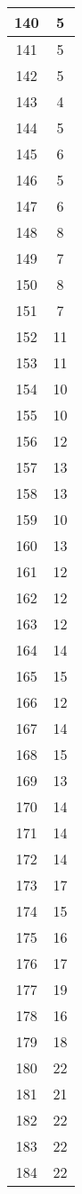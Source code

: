 \documentclass[letterpaper, 12pt]{article}
\begin{document}
\begin{longtable}{|c|c|}
\hline
140 & 5 \\
\hline
141 & 5 \\
\hline
142 & 5 \\
\hline
143 & 4 \\
\hline
144 & 5 \\
\hline
145 & 6 \\
\hline
146 & 5 \\
\hline
147 & 6 \\
\hline
148 & 8 \\
\hline
149 & 7 \\
\hline
150 & 8 \\
\hline
151 & 7 \\
\hline
152 & 11 \\
\hline
153 & 11 \\
\hline
154 & 10 \\
\hline
155 & 10 \\
\hline
156 & 12 \\
\hline
157 & 13 \\
\hline
158 & 13 \\
\hline
159 & 10 \\
\hline
160 & 13 \\
\hline
161 & 12 \\
\hline
162 & 12 \\
\hline
163 & 12 \\
\hline
164 & 14 \\
\hline
165 & 15 \\
\hline
166 & 12 \\
\hline
167 & 14 \\
\hline
168 & 15 \\
\hline
169 & 13 \\
\hline
170 & 14 \\
\hline
171 & 14 \\
\hline
172 & 14 \\
\hline
173 & 17 \\
\hline
174 & 15 \\
\hline
175 & 16 \\
\hline
176 & 17 \\
\hline
177 & 19 \\
\hline
178 & 16 \\
\hline
179 & 18 \\
\hline
180 & 22 \\
\hline
181 & 21 \\
\hline
182 & 22 \\
\hline
183 & 22 \\
\hline
184 & 22 \\

\end{longtable}
\end{document}
